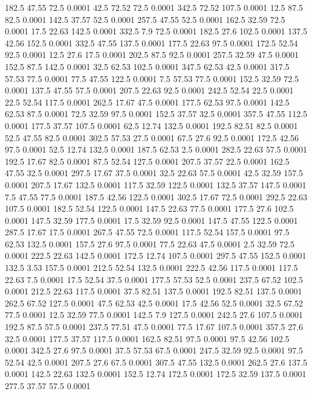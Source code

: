 182.5	47.55	72.5	0.0001
42.5	72.52	72.5	0.0001
342.5	72.52	107.5	0.0001
12.5	87.5	82.5	0.0001
142.5	37.57	52.5	0.0001
257.5	47.55	52.5	0.0001
162.5	32.59	72.5	0.0001
17.5	22.63	142.5	0.0001
332.5	7.9	72.5	0.0001
182.5	27.6	102.5	0.0001
137.5	42.56	152.5	0.0001
332.5	47.55	137.5	0.0001
177.5	22.63	97.5	0.0001
172.5	52.54	92.5	0.0001
12.5	27.6	17.5	0.0001
202.5	87.5	92.5	0.0001
257.5	32.59	47.5	0.0001
152.5	87.5	142.5	0.0001
32.5	62.53	102.5	0.0001
347.5	62.53	42.5	0.0001
317.5	57.53	77.5	0.0001
77.5	47.55	122.5	0.0001
7.5	57.53	77.5	0.0001
152.5	32.59	72.5	0.0001
137.5	47.55	57.5	0.0001
207.5	22.63	92.5	0.0001
242.5	52.54	22.5	0.0001
22.5	52.54	117.5	0.0001
262.5	17.67	47.5	0.0001
177.5	62.53	97.5	0.0001
142.5	62.53	87.5	0.0001
72.5	32.59	97.5	0.0001
152.5	37.57	32.5	0.0001
357.5	47.55	112.5	0.0001
177.5	37.57	107.5	0.0001
62.5	12.74	132.5	0.0001
192.5	82.51	82.5	0.0001
52.5	47.55	82.5	0.0001
302.5	57.53	27.5	0.0001
67.5	27.6	92.5	0.0001
172.5	42.56	97.5	0.0001
52.5	12.74	132.5	0.0001
187.5	62.53	2.5	0.0001
282.5	22.63	57.5	0.0001
192.5	17.67	82.5	0.0001
87.5	52.54	127.5	0.0001
207.5	37.57	22.5	0.0001
162.5	47.55	32.5	0.0001
297.5	17.67	37.5	0.0001
32.5	22.63	57.5	0.0001
42.5	32.59	157.5	0.0001
207.5	17.67	132.5	0.0001
117.5	32.59	122.5	0.0001
132.5	37.57	147.5	0.0001
7.5	47.55	77.5	0.0001
187.5	42.56	122.5	0.0001
302.5	17.67	72.5	0.0001
292.5	22.63	107.5	0.0001
182.5	52.54	122.5	0.0001
147.5	22.63	77.5	0.0001
177.5	27.6	102.5	0.0001
147.5	32.59	177.5	0.0001
17.5	32.59	92.5	0.0001
147.5	47.55	122.5	0.0001
287.5	17.67	17.5	0.0001
267.5	47.55	72.5	0.0001
117.5	52.54	157.5	0.0001
97.5	62.53	132.5	0.0001
157.5	27.6	97.5	0.0001
77.5	22.63	47.5	0.0001
2.5	32.59	72.5	0.0001
222.5	22.63	142.5	0.0001
172.5	12.74	107.5	0.0001
297.5	47.55	152.5	0.0001
132.5	3.53	157.5	0.0001
212.5	52.54	132.5	0.0001
222.5	42.56	117.5	0.0001
117.5	22.63	7.5	0.0001
17.5	52.54	37.5	0.0001
177.5	57.53	52.5	0.0001
237.5	67.52	102.5	0.0001
212.5	22.63	117.5	0.0001
37.5	82.51	137.5	0.0001
192.5	82.51	137.5	0.0001
262.5	67.52	127.5	0.0001
47.5	62.53	42.5	0.0001
17.5	42.56	52.5	0.0001
32.5	67.52	77.5	0.0001
12.5	32.59	77.5	0.0001
142.5	7.9	127.5	0.0001
242.5	27.6	107.5	0.0001
192.5	87.5	57.5	0.0001
237.5	77.51	47.5	0.0001
77.5	17.67	107.5	0.0001
357.5	27.6	32.5	0.0001
177.5	37.57	117.5	0.0001
162.5	82.51	97.5	0.0001
97.5	42.56	102.5	0.0001
342.5	27.6	97.5	0.0001
37.5	57.53	67.5	0.0001
247.5	32.59	92.5	0.0001
97.5	52.54	42.5	0.0001
207.5	27.6	67.5	0.0001
307.5	47.55	132.5	0.0001
262.5	27.6	137.5	0.0001
142.5	22.63	132.5	0.0001
152.5	12.74	172.5	0.0001
172.5	32.59	137.5	0.0001
277.5	37.57	57.5	0.0001
